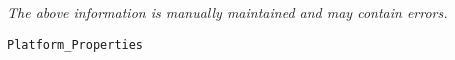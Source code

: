 \label{pkg:platform\_properties}

{\tiny \it The above information is manually maintained and may contain errors.}
\begin{verbatim}
Platform_Properties
\end{verbatim}
